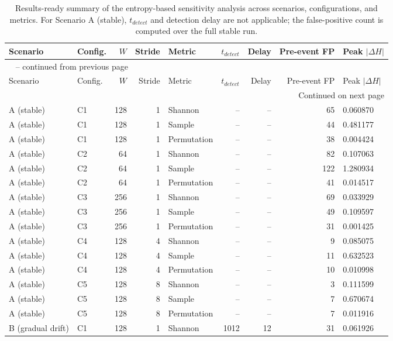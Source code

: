 \begin{longtable}{llrrlrrrl}
\caption{Results-ready summary of the entropy-based sensitivity analysis across scenarios, configurations, and metrics. For Scenario A (stable), $t_{detect}$ and detection delay are not applicable; the false-positive count is computed over the full stable run.}\label{tab:results-ready-summary}\\
\toprule
Scenario & Config. & $W$ & Stride & Metric & $t_{detect}$ & Delay & Pre-event FP & Peak $|\Delta H|$ \\
\midrule
\endfirsthead
\multicolumn{9}{l}{\tablename\ \thetable{} -- continued from previous page}\\
\toprule
Scenario & Config. & $W$ & Stride & Metric & $t_{detect}$ & Delay & Pre-event FP & Peak $|\Delta H|$ \\
\midrule
\endhead
\midrule
\multicolumn{9}{r}{Continued on next page}\\
\endfoot
\bottomrule
\endlastfoot
A (stable) & C1 & 128 & 1 & Shannon & -- & -- & 65 & 0.060870 \\
A (stable) & C1 & 128 & 1 & Sample & -- & -- & 44 & 0.481177 \\
A (stable) & C1 & 128 & 1 & Permutation & -- & -- & 38 & 0.004424 \\
A (stable) & C2 & 64 & 1 & Shannon & -- & -- & 82 & 0.107063 \\
A (stable) & C2 & 64 & 1 & Sample & -- & -- & 122 & 1.280934 \\
A (stable) & C2 & 64 & 1 & Permutation & -- & -- & 41 & 0.014517 \\
A (stable) & C3 & 256 & 1 & Shannon & -- & -- & 69 & 0.033929 \\
A (stable) & C3 & 256 & 1 & Sample & -- & -- & 49 & 0.109597 \\
A (stable) & C3 & 256 & 1 & Permutation & -- & -- & 31 & 0.001425 \\
A (stable) & C4 & 128 & 4 & Shannon & -- & -- & 9 & 0.085075 \\
A (stable) & C4 & 128 & 4 & Sample & -- & -- & 11 & 0.632523 \\
A (stable) & C4 & 128 & 4 & Permutation & -- & -- & 10 & 0.010998 \\
A (stable) & C5 & 128 & 8 & Shannon & -- & -- & 3 & 0.111599 \\
A (stable) & C5 & 128 & 8 & Sample & -- & -- & 7 & 0.670674 \\
A (stable) & C5 & 128 & 8 & Permutation & -- & -- & 7 & 0.011916 \\
B (gradual drift) & C1 & 128 & 1 & Shannon & 1012 & 12 & 31 & 0.061926 \\

\end{longtable}
